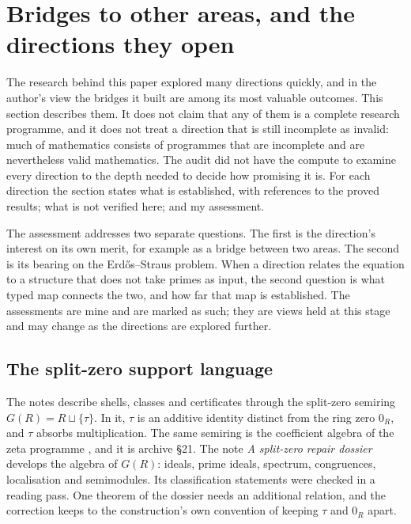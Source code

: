\section{Bridges to other areas, and the directions they open}\label{sec:overlaps}

The research behind this paper explored many directions quickly, and in the author's view the bridges it built are among its most valuable outcomes. This section describes them. It does not claim that any of them is a complete research programme, and it does not treat a direction that is still incomplete as invalid: much of mathematics consists of programmes that are incomplete and are nevertheless valid mathematics. The audit did not have the compute to examine every direction to the depth needed to decide how promising it is. For each direction the section states what is established, with references to the proved results; what is not verified here; and my assessment.

The assessment addresses two separate questions. The first is the direction's interest on its own merit, for example as a bridge between two areas. The second is its bearing on the Erdős--Straus problem. When a direction relates the equation to a structure that does not take primes as input, the second question is what typed map connects the two, and how far that map is established. The assessments are mine and are marked as such; they are views held at this stage and may change as the directions are explored further.

\subsection{The split-zero support language}\label{ssec:splitzero}

The notes describe shells, classes and certificates through the split-zero semiring $G(R)=R\sqcup\{\tau\}$. In it, $\tau$ is an additive identity distinct from the ring zero $0_R$, and $\tau$ absorbs multiplication. The same semiring is the coefficient algebra of the zeta programme \cite{ZetaReader}, and it is archive §21. The note \emph{A split-zero repair dossier} develops the algebra of $G(R)$: ideals, prime ideals, spectrum, congruences, localisation and semimodules. Its classification statements were checked in a reading pass. One theorem of the dossier needs an additional relation, and the correction keeps to the construction's own convention of keeping $\tau$ and $0_R$ apart.

